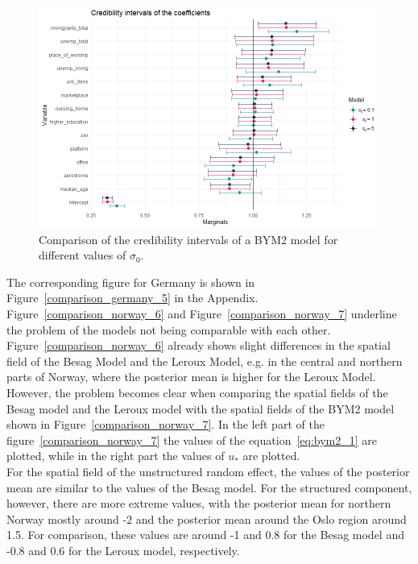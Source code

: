 \begin{figure}[H]
    \centering
    \includegraphics[width = \textwidth]{intervals_prior_norway.png}
    \caption{Comparison of the credibility intervals of a BYM2 model for different values of $\sigma_0$.}
    \label{comparison_norway_5}
\end{figure}
%     
The corresponding figure for Germany is shown in Figure~\ref{comparison_germany_5} in the Appendix. \\
Figure~\ref{comparison_norway_6} and Figure~\ref{comparison_norway_7} underline the problem of the models not being comparable with each other. Figure~\ref{comparison_norway_6} already shows slight differences in the spatial field of the Besag Model and the Leroux Model, e.g. in the central and northern parts of Norway, where the posterior mean is higher for the Leroux Model. However, the problem becomes clear when comparing the spatial fields of the Besag model and the Leroux model with the spatial fields of the BYM2 model shown in Figure~\ref{comparison_norway_7}. In the left part of the figure~\ref{comparison_norway_7} the values of the equation~\ref{eq:bym2_1} are plotted, while in the right part the values of $u_{*}$ are plotted. \\
For the spatial field of the unstructured random effect, the values of the posterior mean are similar to the values of the Besag model. For the structured component, however, there are more extreme values, with the posterior mean for northern Norway mostly around -2 and the posterior mean around the Oslo region around 1.5. For comparison, these values are around -1 and 0.8 for the Besag model and -0.8 and 0.6 for the Leroux model, respectively.
